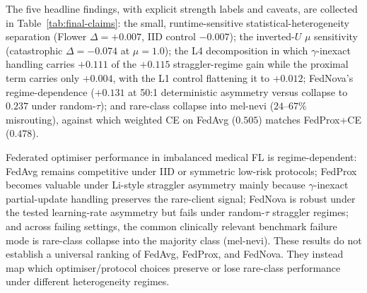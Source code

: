 \documentclass[11pt,a4paper]{report}
\begin{document}
The five headline findings, with explicit strength labels and caveats, are
collected in Table~\ref{tab:final-claims}: the small, runtime-sensitive
statistical-heterogeneity separation (Flower $\Delta = +0.007$, IID control
$-0.007$); the inverted-$U$ $\mu$ sensitivity (catastrophic $\Delta = -0.074$ at
$\mu = 1.0$); the L4 decomposition in which $\gamma$-inexact handling carries
$+0.111$ of the $+0.115$ straggler-regime gain while the proximal term carries
only $+0.004$, with the L1 control flattening it to $+0.012$; FedNova's
regime-dependence ($+0.131$ at 50:1 deterministic asymmetry versus collapse to
$0.237$ under random-$\tau$); and rare-class collapse into mel-nevi ($24$--$67\%$
misrouting), against which weighted CE on FedAvg ($0.505$) matches FedProx+CE
($0.478$).

Federated optimiser performance in imbalanced medical FL is regime-dependent:
FedAvg remains competitive under IID or symmetric low-risk protocols;
FedProx becomes valuable under Li-style straggler asymmetry mainly because
$\gamma$-inexact partial-update handling preserves the rare-client signal;
FedNova is robust under the tested learning-rate asymmetry but fails under
random-$\tau$ straggler regimes; and across failing settings, the common
clinically relevant benchmark failure mode is rare-class collapse into the
majority class (mel-nevi). These results do not establish a universal ranking of FedAvg,
FedProx, and FedNova. They instead map which optimiser/protocol choices
preserve or lose rare-class performance under different heterogeneity
regimes.
\end{document}
